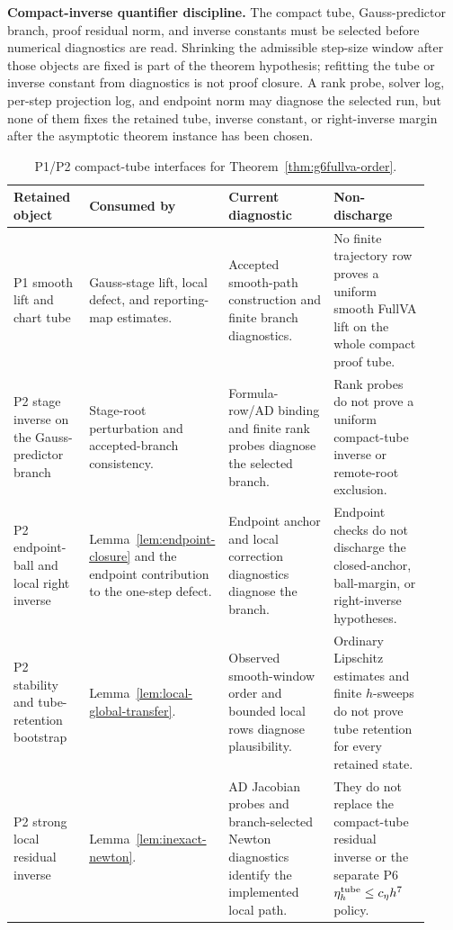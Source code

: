 \documentclass[preprint,12pt]{elsarticle}
\begin{document}
\noindent\textbf{Compact-inverse quantifier discipline.}
The compact tube, Gauss-predictor branch,
proof residual norm, and inverse constants must be selected before numerical
diagnostics are read. Shrinking the admissible step-size window after those
objects are fixed is part of the theorem hypothesis; refitting the tube or
inverse constant from diagnostics is not proof closure.
A rank probe, solver log, per-step projection log, and endpoint norm may
diagnose the selected run, but none of them fixes the retained tube, inverse
constant, or right-inverse margin after the asymptotic theorem instance has
been chosen.

\begin{table}[htbp]
\centering
\caption{P1/P2 compact-tube interfaces for
Theorem~\ref{thm:g6fullva-order}.}
\label{tab:p1p2-compact-tube-obligation-ledger}
\scriptsize
\setlength{\tabcolsep}{2pt}
\renewcommand{\arraystretch}{0.9}
\begin{tabular}{P{0.18\linewidth}P{0.26\linewidth}P{0.25\linewidth}P{0.23\linewidth}}
\toprule
Retained object & Consumed by & Current diagnostic & Non-discharge \\
\midrule
P1 smooth lift and chart tube &
Gauss-stage lift, local defect, and reporting-map estimates. &
Accepted smooth-path construction and finite branch diagnostics. &
No finite trajectory row proves a uniform smooth FullVA lift on the whole
compact proof tube. \\
P2 stage inverse on the Gauss-predictor branch &
Stage-root perturbation and accepted-branch consistency. &
Formula-row/AD binding and finite rank probes diagnose the selected branch. &
Rank probes do not prove a uniform compact-tube inverse or remote-root
exclusion. \\
P2 endpoint-ball and local right inverse &
Lemma~\ref{lem:endpoint-closure} and the endpoint contribution to the
one-step defect. &
Endpoint anchor and local correction diagnostics diagnose the branch. &
Endpoint checks do not discharge the closed-anchor, ball-margin, or
right-inverse hypotheses. \\
P2 stability and tube-retention bootstrap &
Lemma~\ref{lem:local-global-transfer}. &
Observed smooth-window order and bounded local rows diagnose plausibility. &
Ordinary Lipschitz estimates and finite \(h\)-sweeps do not prove tube
retention for every retained state. \\
P2 strong local residual inverse &
Lemma~\ref{lem:inexact-newton}. &
AD Jacobian probes and branch-selected Newton diagnostics identify the
implemented local path. &
They do not replace the compact-tube residual inverse or the separate P6
\(\eta_h^{\rm tube}\le c_\eta h^7\) policy. \\
\bottomrule
\end{tabular}
\end{table}
\end{document}
